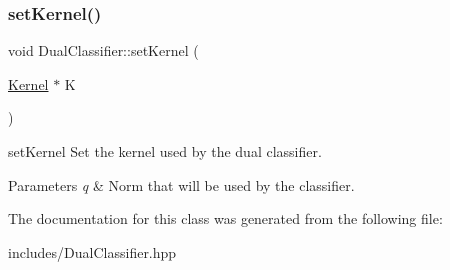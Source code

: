 \subsubsection{\texorpdfstring{set\+Kernel()}{setKernel()}}
{\footnotesize\ttfamily void Dual\+Classifier\+::set\+Kernel (\begin{DoxyParamCaption}\item[{\hyperlink{class_kernel}{Kernel} $\ast$}]{K }\end{DoxyParamCaption})\hspace{0.3cm}{\ttfamily [inline]}}



set\+Kernel Set the kernel used by the dual classifier. 


\begin{DoxyParams}{Parameters}
{\em q} & Norm that will be used by the classifier. \\
\hline
\end{DoxyParams}


The documentation for this class was generated from the following file\+:\begin{DoxyCompactItemize}
\item 
includes/Dual\+Classifier.\+hpp\end{DoxyCompactItemize}
